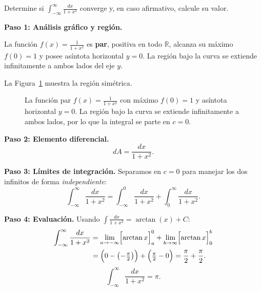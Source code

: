 \begin{example}
Determine si $\displaystyle\int_{-\infty}^{\infty}\frac{dx}{1+x^2}$ converge y, en caso
afirmativo, calcule su valor.
\begin{myproof}
\textbf{Paso 1: Análisis gráfico y región.}

La función $f(x)=\tfrac{1}{1+x^2}$ es \textbf{par}, positiva en todo $\mathbb{R}$, alcanza su
máximo $f(0)=1$ y posee asíntota horizontal $y=0$. La región bajo la curva se extiende
infinitamente a ambos lados del eje $y$.

La Figura~\ref{fig:impropia_lorentziana} muestra la región simétrica.

\begin{figure}[H]
\centering
{}
\caption{La función par $f(x)=\tfrac{1}{1+x^2}$ con máximo $f(0)=1$ y asíntota horizontal $y=0$. La región bajo la curva se extiende infinitamente a ambos lados, por lo que la integral se parte en $c=0$.}
\label{fig:impropia_lorentziana}
\end{figure}

\textbf{Paso 2: Elemento diferencial.}
\[
  dA = \frac{dx}{1+x^2}.
\]

\textbf{Paso 3: Límites de integración.}
Separamos en $c=0$ para manejar los dos infinitos de forma \emph{independiente}:
\[
  \int_{-\infty}^{\infty}\frac{dx}{1+x^2}
  = \int_{-\infty}^{0}\frac{dx}{1+x^2}
  + \int_{0}^{\infty}\frac{dx}{1+x^2}.
\]

\textbf{Paso 4: Evaluación.}
Usando $\int\tfrac{dx}{1+x^2}=\arctan(x)+C$:
\begin{align*}
\int_{-\infty}^{\infty}\frac{dx}{1+x^2}
  &= \lim_{a\to -\infty}\Bigl[\arctan x\Bigr]_a^{0}
   + \lim_{b\to\infty}\Bigl[\arctan x\Bigr]_0^{b} \\
  &= \Bigl(0-\bigl(-\tfrac{\pi}{2}\bigr)\Bigr)
   + \Bigl(\tfrac{\pi}{2}-0\Bigr)
   = \frac{\pi}{2}+\frac{\pi}{2}.
\end{align*}
\[
  \boxed{\int_{-\infty}^{\infty}\frac{dx}{1+x^2} = \pi.}
\]
\end{myproof}
\end{example}

